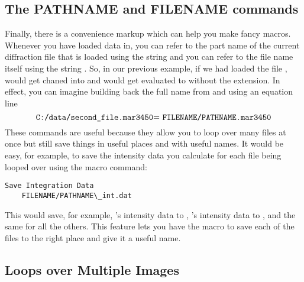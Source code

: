 \subsection{The PATHNAME and FILENAME commands}

Finally, there is a convenience markup which can help
you make fancy macros. Whenever you have loaded data 
in, you can refer to the part name of the current
diffraction file that is loaded using the string
 and you can refer to the file
name itself using the string . 
So, in our previous example, if we had loaded the
file ,
 would get chaned into 
 and  would
get evaluated to  without
the extension. In effect, you can imagine building 
back the full name from  and
 using an equation line
\begin{equation*}
    \text{{\ttfamily C:/data/second\_file.mar3450}=
    {\ttfamily FILENAME/PATHNAME.mar3450}}
\end{equation*}
These commands are useful because they allow you to
loop over many files at once but still save things 
in useful places and with useful names. It would be
easy, for example, to save the intensity data you
calculate for each file being looped over using the 
macro command:
\begin{lstlisting}[caption={'Using the FILENAME and PATHNAME Markup'}]
Save Integration Data
    FILENAME/PATHNAME\_int.dat
\end{lstlisting}
This would save, for example, 
's intensity data to
,
's intensity data 
to , and the
same for all the others. This feature lets you have
the macro to save each of the files to the right place
and give it a useful name.

\subsection{Loops over Multiple Images}

